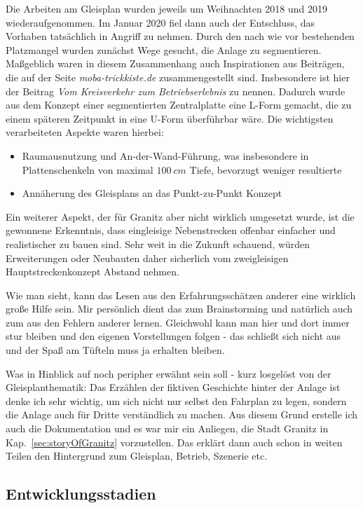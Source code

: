 Die Arbeiten am Gleisplan wurden jeweils um Weihnachten 2018 und 2019 wiederaufgenommen.
Im Januar 2020 fiel dann auch der Entschluss, das Vorhaben tats\"achlich in Angriff zu nehmen.
Durch den nach wie vor bestehenden Platzmangel wurden zun\"achst Wege gesucht, die Anlage zu segmentieren.
Ma{\ss}geblich waren in diesem Zusammenhang auch Inspirationen aus Beitr\"agen, die auf der Seite \textit{moba-trickkiste.de} zusammengestellt sind.
Insbesondere ist hier der Beitrag \textit{Vom Kreisverkehr zum Betriebserlebnis} \cite{Gee17} zu nennen.
Dadurch wurde aus dem Konzept einer segmentierten Zentralplatte eine L-Form gemacht, die zu einem sp\"ateren Zeitpunkt in eine U-Form \"uberf\"uhrbar w\"are.
Die wichtigsten verarbeiteten Aspekte waren hierbei:
\begin{itemize}
	\item Raumausnutzung und An-der-Wand-F\"uhrung, was insbesondere in Plattenschenkeln von maximal $100~cm$ Tiefe, bevorzugt weniger resultierte
	\item Ann\"aherung des Gleisplans an das Punkt-zu-Punkt Konzept
\end{itemize}
Ein weiterer Aspekt, der f\"ur Granitz aber nicht wirklich umgesetzt wurde, ist die gewonnene Erkenntnis, dass eingleisige Nebenstrecken offenbar einfacher und realistischer zu bauen sind.
Sehr weit in die Zukunft schauend, w\"urden Erweiterungen oder Neubauten daher sicherlich vom zweigleisigen Hauptstreckenkonzept Abstand nehmen.

Wie man sieht, kann das Lesen aus den Erfahrungssch\"atzen anderer eine wirklich gro{\ss}e Hilfe sein.
Mir pers\"onlich dient das zum Brainstorming und nat\"urlich auch zum aus den Fehlern anderer lernen.
Gleichwohl kann man hier und dort immer stur bleiben und den eigenen Vorstellungen folgen - das schlie{\ss}t sich nicht aus und der Spa{\ss} am T\"ufteln muss ja erhalten bleiben.

Was in Hinblick auf \cite{Gee17} noch peripher erw\"ahnt sein soll - kurz losgel\"ost von der Gleisplanthematik:
Das Erz\"ahlen der fiktiven Geschichte hinter der Anlage ist denke ich sehr wichtig, um sich nicht nur selbst den Fahrplan zu legen, sondern die Anlage auch f\"ur Dritte verst\"andlich zu machen.
Aus diesem Grund erstelle ich auch die Dokumentation und es war mir ein Anliegen, die Stadt Granitz in Kap.~\ref{sec:storyOfGranitz} vorzustellen.
Das erkl\"art dann auch schon in weiten Teilen den Hintergrund zum Gleisplan, Betrieb, Szenerie etc.


\subsection{Entwicklungsstadien}
\label{sec:map_history}

